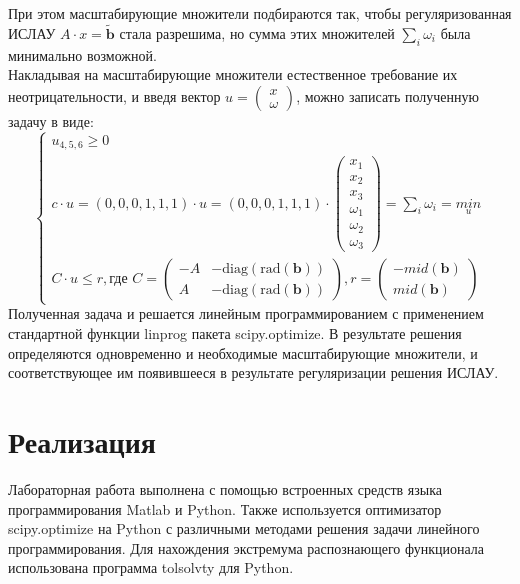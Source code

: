 \documentclass[12pt,a4paper]{scrartcl}
\begin{document}
При этом масштабирующие множители подбираются так, чтобы регуляризованная ИСЛАУ $A \cdot x = \tilde{\textbf{b}}$ стала разрешима, но сумма этих множителей $\sum_{i}{\omega_{i}}$ была минимально возможной. \\
Накладывая на масштабирующие множители естественное требование их неотрицательности, и введя вектор $u = \begin{pmatrix}x \\ \omega\end{pmatrix}$, можно записать полученную задачу в виде:
\begin{equation}
    \begin{cases}
    u_{4, 5, 6} \geq 0 \\
    c \cdot u = (0,0,0,1,1,1) \cdot u= (0,0,0,1,1,1) \cdot \begin{pmatrix}
    x_{1} \\ x_{2} \\ x_{3} \\ \omega_{1} \\ \omega_{2} \\ \omega_{3}
    \end{pmatrix} = \sum_{i}{\omega_{i}} = \underset{u}{min} \\
    C \cdot u \leq r, \text{где } C = \begin{pmatrix}
    -A & -\text{diag}(\text{rad}(\textbf{b})) \\
    A & -\text{diag}(\text{rad}(\textbf{b}))
    \end{pmatrix}, r = \begin{pmatrix}
    -mid(\textbf{b}) \\
    mid(\textbf{b})
    \end{pmatrix}
    \end{cases}
    \label{system}
\end{equation}
Полученная задача и решается линейным программированием с применением стандартной
функции linprog пакета scipy.optimize. В результате решения определяются одновременно и
необходимые масштабирующие множители, и соответствующее им появившееся в результате
регуляризации решения ИСЛАУ.


\section {Реализация}
Лабораторная работа выполнена с помощью встроенных средств языка программирования Matlab и Python. Также используется оптимизатор scipy.optimize на Python с различными методами решения задачи линейного программирования.
Для нахождения экстремума распознающего функционала использована программа tolsolvty для Python.
\end{document}
